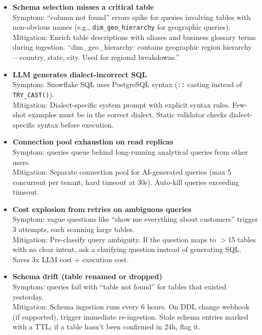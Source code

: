 \begin{itemize}
  \item \textbf{Schema selection misses a critical table}\\
    Symptom: ``column not found'' errors spike for queries involving tables with non-obvious names (e.g., \texttt{dim\_geo\_hierarchy} for geographic queries).\\
    Mitigation: Enrich table descriptions with aliases and business glossary terms during ingestion. ``dim\_geo\_hierarchy: contains geographic region hierarchy---country, state, city. Used for regional breakdowns.''

  \item \textbf{LLM generates dialect-incorrect SQL}\\
    Symptom: Snowflake SQL uses PostgreSQL syntax (\texttt{::} casting instead of \texttt{TRY\_CAST()}).\\
    Mitigation: Dialect-specific system prompt with explicit syntax rules. Few-shot examples must be in the correct dialect. Static validator checks dialect-specific syntax before execution.

  \item \textbf{Connection pool exhaustion on read replicas}\\
    Symptom: queries queue behind long-running analytical queries from other users.\\
    Mitigation: Separate connection pool for AI-generated queries (max 5 concurrent per tenant, hard timeout at 30s). Auto-kill queries exceeding timeout.

  \item \textbf{Cost explosion from retries on ambiguous queries}\\
    Symptom: vague questions like ``show me everything about customers'' trigger 3 attempts, each scanning large tables.\\
    Mitigation: Pre-classify query ambiguity. If the question maps to $>$15 tables with no clear intent, ask a clarifying question instead of generating SQL. Saves 3x LLM cost + execution cost.

  \item \textbf{Schema drift (table renamed or dropped)}\\
    Symptom: queries fail with ``table not found'' for tables that existed yesterday.\\
    Mitigation: Schema ingestion runs every 6 hours. On DDL change webhook (if supported), trigger immediate re-ingestion. Stale schema entries marked with a TTL; if a table hasn't been confirmed in 24h, flag it.
\end{itemize}

